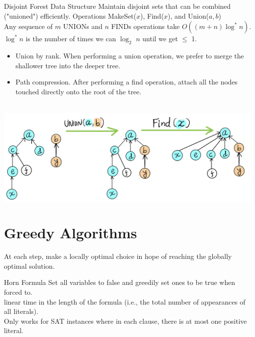 \documentclass[10pt,a4paper]{article}
\begin{document}
\begin{multicols}{3}
\begin{textbox}{Disjoint Forest Data Structure} 
    Maintain disjoint sets that can be combined ("unioned") efficiently. Operations MakeSet($x$), Find($x$), and Union($a, b$)\\
    \linebreak
     Any sequence of $m$ UNIONs and $n$ FINDs operations take $O((m + n) \log^* n)$.\\
     $\log^* n$ is the number of times we can $\log_2$ $n$ until we get $\leq$ 1.\\
    \begin{itemize}
        \item Union by rank. When performing a union operation, we prefer to merge the shallower tree into the deeper tree.
        \item Path compression. After performing a find operation, attach all the nodes touched directly onto the root of the tree.
    \end{itemize}
    \\
    \includegraphics[width=\textwidth]{images/Union-Find.jpeg}
\end{textbox}

\section{Greedy Algorithms}

\begin{textbox}{}
     At each step, make a locally optimal choice in hope of reaching the globally optimal solution. \\
\end{textbox}
\begin{textbox}{Horn Formula}
     Set all variables to false and greedily set ones to be true when forced to.\\
    \linebreak
     linear time in the length of the formula (i.e., the total number of appearances of all literals). \\
    \linebreak
     Only works for SAT instances where in each clause, there is at most one positive literal.
\end{textbox}


\end{multicols}
\end{document}
